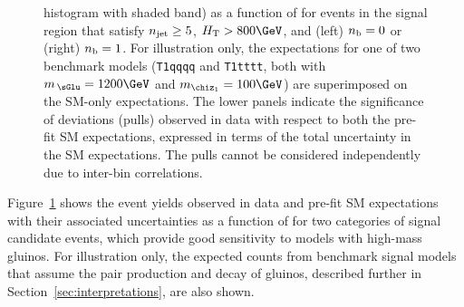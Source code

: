 \begin{figure}[!t]
{    histogram with shaded band) as a function of \HTmiss for events in
    the signal region that satisfy $n_{\text{jet}} \geq 5$, $\scalht >
    800\GeV$, and (left) $n_{\text{b}} = 0$ or (right) $n_{\text{b}} = 1$. For
    illustration only, the expectations for one of two benchmark
    models (\texttt{T1qqqq} and \texttt{T1tttt}, both with
    $m_{\,\sGlu} = 1200\GeV$ and $m_{\chiz_1} = 100\GeV$) are
    superimposed on the SM-only expectations. The lower panels
    indicate the significance of deviations (pulls) observed in data
    with respect to both the pre-fit SM expectations, expressed in
    terms of the total uncertainty in the SM expectations. The pulls
    cannot be considered independently due to inter-bin
    correlations. }
    \label{fig:mht-templates} 
\end{figure}

Figure~\ref{fig:mht-templates} shows the event yields observed in data
and pre-fit SM expectations with their associated uncertainties as
a function of \HTmiss for two categories of signal candidate events,
which provide good sensitivity to models with high-mass gluinos. For
illustration only, the expected counts from benchmark signal models
that assume the pair production and decay of gluinos, described
further in Section~\ref{sec:interpretations}, are also shown.

%
%
%

